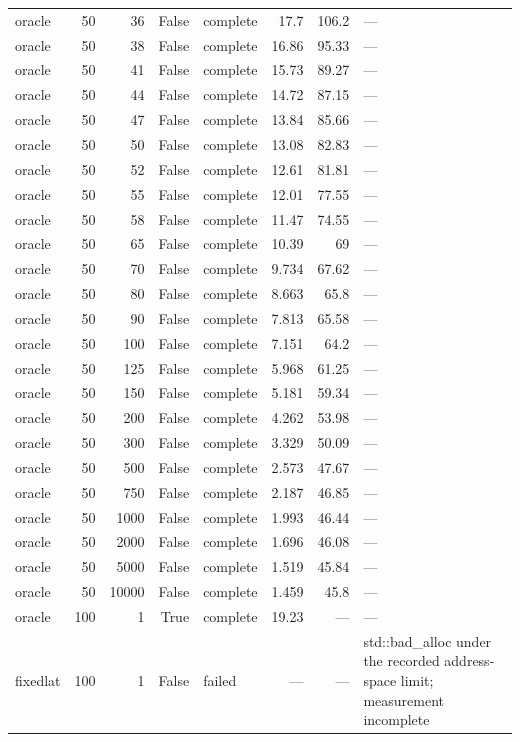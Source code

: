 \begin{tabular}{lrrrlrrl}
oracle & 50 & 36 & False & complete & 17.7 & 106.2 & — \\
oracle & 50 & 38 & False & complete & 16.86 & 95.33 & — \\
oracle & 50 & 41 & False & complete & 15.73 & 89.27 & — \\
oracle & 50 & 44 & False & complete & 14.72 & 87.15 & — \\
oracle & 50 & 47 & False & complete & 13.84 & 85.66 & — \\
oracle & 50 & 50 & False & complete & 13.08 & 82.83 & — \\
oracle & 50 & 52 & False & complete & 12.61 & 81.81 & — \\
oracle & 50 & 55 & False & complete & 12.01 & 77.55 & — \\
oracle & 50 & 58 & False & complete & 11.47 & 74.55 & — \\
oracle & 50 & 65 & False & complete & 10.39 & 69 & — \\
oracle & 50 & 70 & False & complete & 9.734 & 67.62 & — \\
oracle & 50 & 80 & False & complete & 8.663 & 65.8 & — \\
oracle & 50 & 90 & False & complete & 7.813 & 65.58 & — \\
oracle & 50 & 100 & False & complete & 7.151 & 64.2 & — \\
oracle & 50 & 125 & False & complete & 5.968 & 61.25 & — \\
oracle & 50 & 150 & False & complete & 5.181 & 59.34 & — \\
oracle & 50 & 200 & False & complete & 4.262 & 53.98 & — \\
oracle & 50 & 300 & False & complete & 3.329 & 50.09 & — \\
oracle & 50 & 500 & False & complete & 2.573 & 47.67 & — \\
oracle & 50 & 750 & False & complete & 2.187 & 46.85 & — \\
oracle & 50 & 1000 & False & complete & 1.993 & 46.44 & — \\
oracle & 50 & 2000 & False & complete & 1.696 & 46.08 & — \\
oracle & 50 & 5000 & False & complete & 1.519 & 45.84 & — \\
oracle & 50 & 10000 & False & complete & 1.459 & 45.8 & — \\
oracle & 100 & 1 & True & complete & 19.23 & — & — \\
fixedlat & 100 & 1 & False & failed & — & — & std::bad\_alloc under the recorded address-space limit; measurement incomplete \\

\end{tabular}
